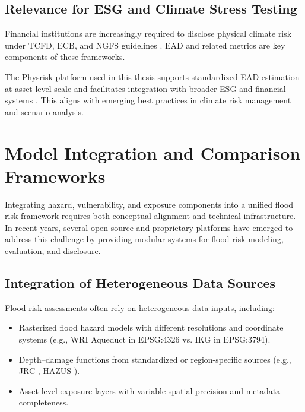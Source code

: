 \subsection{Relevance for ESG and Climate Stress Testing}

Financial institutions are increasingly required to disclose physical climate risk under TCFD, ECB, and NGFS guidelines \cite{tcfd2017, ecb2020}. EAD and related metrics are key components of these frameworks.

The Physrisk platform used in this thesis supports standardized EAD estimation at asset-level scale and facilitates integration with broader ESG and financial systems \cite{moorhouse2024}. This aligns with emerging best practices in climate risk management and scenario analysis.


\section{Model Integration and Comparison Frameworks}

Integrating hazard, vulnerability, and exposure components into a unified flood risk framework requires both conceptual alignment and technical infrastructure. In recent years, several open-source and proprietary platforms have emerged to address this challenge by providing modular systems for flood risk modeling, evaluation, and disclosure.

\subsection{Integration of Heterogeneous Data Sources}

Flood risk assessments often rely on heterogeneous data inputs, including:

\begin{itemize}
    \item Rasterized flood hazard models with different resolutions and coordinate systems (e.g., WRI Aqueduct in EPSG:4326 vs. IKG in EPSG:3794).
    \item Depth–damage functions from standardized or region-specific sources (e.g., JRC \cite{huizinga_global_2017}, HAZUS \cite{scawthorn_hazus-mh_2006}).
    \item Asset-level exposure layers with variable spatial precision and metadata completeness.
\end{itemize}

